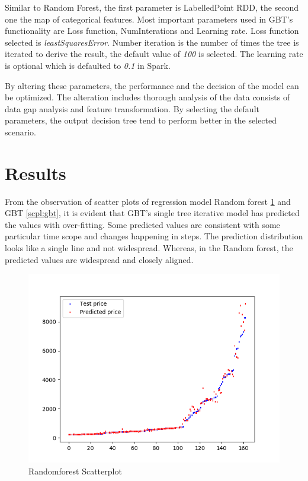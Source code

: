\documentclass[sigconf]{acmart}
\begin{document}
Similar to Random Forest, the first parameter is LabelledPoint RDD,
the second one the map of categorical features. Most important parameters used in GBT's functionality are Loss function, NumInterations and Learning rate. Loss function selected is {\em leastSquaresError}. Number iteration is the number of times the tree is iterated to derive the result, the default value of {\em 100} is selected. The learning rate is optional which is defaulted to {\em 0.1} in Spark.

By altering these parameters, the performance and the decision of the model can be optimized. The alteration includes thorough analysis of the data consists of data gap analysis and feature transformation.
By selecting the default parameters, the output decision tree tend to perform better in the selected scenario.

\section{Results}

From the observation of scatter plots of regression model Random forest \ref{scpl:ran} and GBT \ref{scpl:gbt}, it is evident that GBT's single tree iterative model has predicted the values with over-fitting. Some predicted values are consistent with some particular time scope and changes happening in steps. The prediction distribution looks like a single line and not widespread. Whereas, in the Random forest, the predicted values are widespread and closely aligned.

\begin{figure}[!ht]
  \centering\includegraphics[width=\columnwidth]{images/RandomForestscatterplot.png}
  \caption{Randomforest Scatterplot}
  \label{scpl:ran}
\end{figure}
\end{document}
